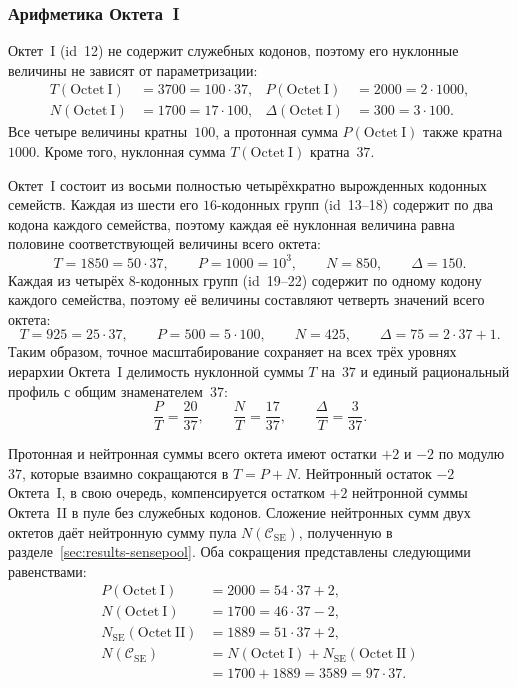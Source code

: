 \documentclass[11pt,a4paper]{article}
\renewcommand{\_}{\origunderscore\allowbreak}
\begin{document}
\subsubsection{Арифметика Октета~I}
\label{sec:results-octetI}

Октет~I (id~12) не содержит служебных кодонов, поэтому его нуклонные
величины не зависят от параметризации:
\[
\begin{aligned}
T(\mathrm{Octet~I}) &= 3700 = 100 \cdot 37, &
P(\mathrm{Octet~I}) &= 2000 = 2 \cdot 1000, \\
N(\mathrm{Octet~I}) &= 1700 = 17 \cdot 100, &
\Delta(\mathrm{Octet~I}) &= 300 = 3 \cdot 100.
\end{aligned}
\]
Все четыре величины кратны~$100$, а протонная сумма
$P(\mathrm{Octet~I})$ также кратна~$1000$. Кроме того, нуклонная
сумма $T(\mathrm{Octet~I})$ кратна~$37$.

Октет~I состоит из восьми полностью четырёхкратно вырожденных кодонных
семейств. Каждая из шести его $16$-кодонных групп (id~13--18) содержит
по два кодона каждого семейства, поэтому каждая её нуклонная величина
равна половине соответствующей величины всего октета:
\[
T = 1850 = 50 \cdot 37, \qquad
P = 1000 = 10^{3}, \qquad
N = 850, \qquad
\Delta = 150.
\]
Каждая из четырёх $8$-кодонных групп (id~19--22) содержит по одному
кодону каждого семейства, поэтому её величины составляют четверть
значений всего октета:
\[
T = 925 = 25 \cdot 37, \qquad
P = 500 = 5 \cdot 100, \qquad
N = 425, \qquad
\Delta = 75 = 2 \cdot 37 + 1.
\]
Таким образом, точное масштабирование сохраняет на всех трёх уровнях
иерархии Октета~I делимость нуклонной суммы $T$ на~$37$ и единый
рациональный профиль с общим знаменателем~$37$:
\[
\frac{P}{T} = \frac{20}{37},
\qquad
\frac{N}{T} = \frac{17}{37},
\qquad
\frac{\Delta}{T} = \frac{3}{37}.
\]

Протонная и нейтронная суммы всего октета имеют остатки $+2$ и $-2$
по модулю~$37$, которые взаимно сокращаются в $T = P + N$. Нейтронный
остаток $-2$ Октета~I, в свою очередь, компенсируется остатком $+2$
нейтронной суммы Октета~II в пуле без служебных кодонов. Сложение
нейтронных сумм двух октетов даёт нейтронную сумму пула
$N(\mathcal{C}_{\mathrm{SE}})$, полученную в
разделе~\ref{sec:results-sensepool}. Оба сокращения представлены
следующими равенствами:
\[
\begin{aligned}
P(\mathrm{Octet~I})
  &= 2000 = 54 \cdot 37 + 2, \\
N(\mathrm{Octet~I})
  &= 1700 = 46 \cdot 37 - 2, \\
N_{\mathrm{SE}}(\mathrm{Octet~II})
  &= 1889 = 51 \cdot 37 + 2, \\
N(\mathcal{C}_{\mathrm{SE}})
  &= N(\mathrm{Octet~I})
   + N_{\mathrm{SE}}(\mathrm{Octet~II}) \\
  &= 1700 + 1889 = 3589 = 97 \cdot 37.
\end{aligned}
\]
\end{document}
